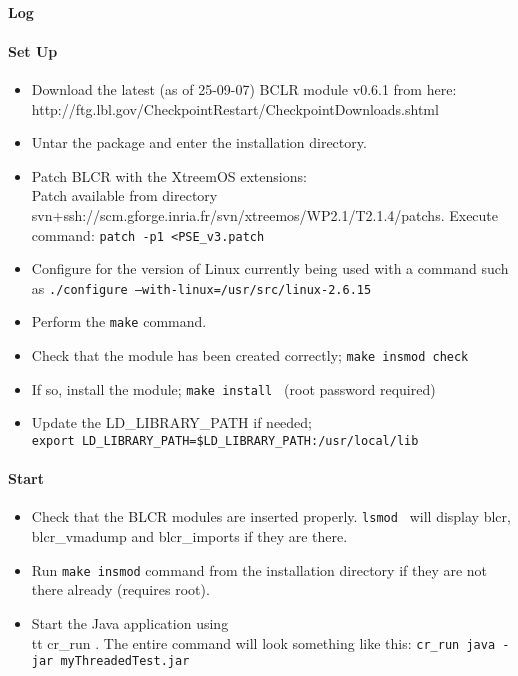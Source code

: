 \paragraph{Log}

\paragraph{Set Up}
\begin{itemize}
\item Download the latest (as of 25-09-07) BCLR module v0.6.1 from here:\\ 	http://ftg.lbl.gov/CheckpointRestart/CheckpointDownloads.shtml
\item Untar the package and enter the installation directory.
\item Patch BLCR with the XtreemOS extensions:\\
Patch available from directory svn+ssh://scm.gforge.inria.fr/svn/xtreemos/WP2.1/T2.1.4/patchs.
	Execute command: {\tt patch -p1 <PSE\_v3.patch }
\item Configure for the version of Linux currently being used with a command such as {\tt ./configure --with-linux=/usr/src/linux-2.6.15}
\item Perform the {\tt make} command.
\item Check that the module has been created correctly; {\tt make insmod check }
\item If so, install the module; {\tt make install } (root password required)
\item Update the LD\_LIBRARY\_PATH if needed;\\
	{\tt\footnotesize export LD\_LIBRARY\_PATH=\$LD\_LIBRARY\_PATH:/usr/local/lib}
\end{itemize}

\paragraph{Start}
\begin{itemize}
\item Check that the BLCR modules are inserted properly. {\tt lsmod } will display blcr, blcr\_vmadump and blcr\_imports if they are there.
\item Run {\tt make insmod} command from the installation directory if they are not there already (requires root).
\item Start the Java application using {\\tt cr\_run }. The entire command will look something like this: {\tt cr\_run java -jar myThreadedTest.jar}
\end{itemize}


